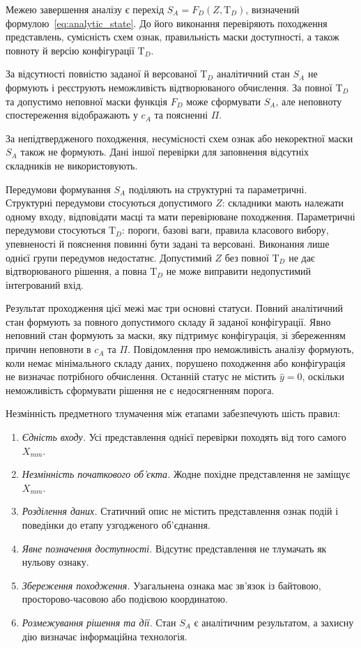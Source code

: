 Межею завершення аналізу є перехід $S_A=F_D(Z,\mathrm T_D)$, визначений формулою~\eqref{eq:analytic_state}. До його виконання перевіряють походження представлень, сумісність схем ознак, правильність маски доступності, а також повноту й версію конфігурації $\mathrm T_D$.

За відсутності повністю заданої й версованої $\mathrm T_D$ аналітичний стан $S_A$ не формують і реєструють неможливість відтворюваного обчислення. За повної $\mathrm T_D$ та допустимо неповної маски функція $F_D$ може сформувати $S_A$, але неповноту спостереження відображають у $c_A$ та поясненні $\Pi$.

За непідтвердженого походження, несумісності схем ознак або некоректної маски $S_A$ також не формують. Дані іншої перевірки для заповнення відсутніх складників не використовують.

Передумови формування $S_A$ поділяють на структурні та параметричні. Структурні передумови стосуються допустимого $Z$: складники мають належати одному входу, відповідати масці та мати перевірюване походження. Параметричні передумови стосуються $\mathrm T_D$: пороги, базові ваги, правила класового вибору, упевненості й пояснення повинні бути задані та версовані. Виконання лише однієї групи передумов недостатнє. Допустимий $Z$ без повної $\mathrm T_D$ не дає відтворюваного рішення, а повна $\mathrm T_D$ не може виправити недопустимий інтегрований вхід.

Результат проходження цієї межі має три основні статуси. Повний аналітичний стан формують за повного допустимого складу й заданої конфігурації. Явно неповний стан формують за маски, яку підтримує конфігурація, зі збереженням причин неповноти в $c_A$ та $\Pi$. Повідомлення про неможливість аналізу формують, коли немає мінімального складу даних, порушено походження або конфігурація не визначає потрібного обчислення. Останній статус не містить $\hat y=0$, оскільки неможливість сформувати рішення не є недосягненням порога.

Незмінність предметного тлумачення між етапами забезпечують шість правил:

\begin{enumerate}
\item \textit{Єдність входу.} Усі представлення однієї перевірки походять від того самого $X_{mm}$.
\item \textit{Незмінність початкового об’єкта.} Жодне похідне представлення не заміщує $X_{mm}$.
\item \textit{Розділення даних.} Статичний опис не містить представлення ознак подій і поведінки до етапу узгодженого об’єднання.
\item \textit{Явне позначення доступності.} Відсутнє представлення не тлумачать як нульову ознаку.
\item \textit{Збереження походження.} Узагальнена ознака має зв’язок із байтовою, просторово-часовою або подієвою координатою.
\item \textit{Розмежування рішення та дії.} Стан $S_A$ є аналітичним результатом, а захисну дію визначає інформаційна технологія.
\end{enumerate}

